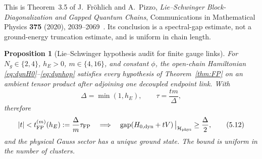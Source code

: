 \documentclass[11pt]{article}
\newtheorem{proposition}[theorem]{Proposition}
\theoremstyle{remark}
\newcommand{\Hh}{\mathcal H}
\newcommand{\gap}{\operatorname{gap}}
\begin{document}
This is Theorem~3.5 of
J.~Fröhlich and A.~Pizzo,
\emph{Lie--Schwinger Block-Diagonalization and Gapped Quantum Chains},
Communications in Mathematical Physics \textbf{375} (2020),
2039--2069~\cite{FP2020}.  Its conclusion is a spectral-gap estimate,
not a ground-energy truncation estimate, and is uniform in chain
length.

\begin{proposition}[Lie--Schwinger hypothesis audit for finite gauge
links]
\label{prop:FPaudit}
For $N_g\in\{2,4\}$, $h_E>0$, $m\in\{4,16\}$, and constant $\phi$, the
open-chain Hamiltonian \eqref{eq:dynH0}--\eqref{eq:dynhop} satisfies
every hypothesis of Theorem~\ref{thm:FP} on an ambient tensor product
after adjoining one decoupled endpoint link.  With
\[
 \Delta=\min(1,h_E),\qquad
 \tau=\frac{tm}{\Delta},
\tag{5.11}\label{eq:FPscale}
\]
therefore
\[
 |t|<t_{\rm FP}^{(m)}(h_E)
 :=\frac{\Delta}{m}\tau_{\rm FP}
 \quad\Longrightarrow\quad
 \gap\!\left(
 H_{0,\mathrm{dyn}}+tV
 \right)\big|_{\Hh_{\rm phys}}
 \geq\frac{\Delta}{2},
\tag{5.12}\label{eq:FPwindow}
\]
and the physical Gauss sector has a unique ground state.  The bound is
uniform in the number of clusters.
\end{proposition}
\end{document}
